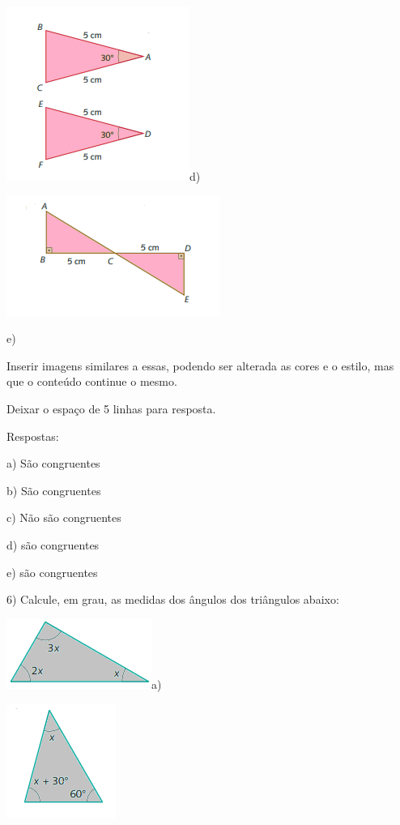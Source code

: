 \includegraphics[width=2.35417in,height=2.23958in]{./imgSAEB_8_MAT/media/image22.png}d)

\includegraphics[width=2.73958in,height=1.54167in]{./imgSAEB_8_MAT/media/image23.png}

e)

Inserir imagens similares a essas, podendo ser alterada as cores e o
estilo, mas que o conteúdo continue o mesmo.

Deixar o espaço de 5 linhas para resposta.

Respostas:

a) São congruentes

b) São congruentes

c) Não são congruentes

d) são congruentes

e) são congruentes

6) Calcule, em grau, as medidas dos ângulos dos triângulos abaixo:

\includegraphics[width=1.86458in,height=0.89583in]{./imgSAEB_8_MAT/media/image24.png}a)

\includegraphics[width=1.40625in,height=1.47917in]{./imgSAEB_8_MAT/media/image25.png}

